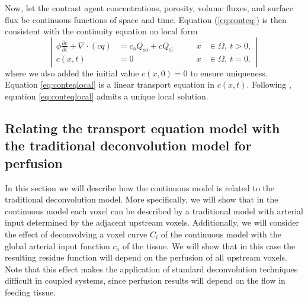 \documentclass[journal,twocolumn]{IEEEtran}
\newcommand{\Qso}{Q_{\mathrm{so}}}
\newcommand{\Qsi}{Q_{\mathrm{si}}}
\newcommand{\ca}{c_\mathrm{a}}
\begin{document}
	Now, let the contrast agent concentrations, porosity, volume fluxes, and surface flux be continuous functions of space and time. 
	Equation (\ref{eq:conteq}) is then consistent with the continuity equation on local form
	\begin{equation}
		\left\vert
		\begin{alignedat}{2}
			\phi \frac{\partial c}{\partial t} + \nabla \cdot (cq) &= \ca\Qso + c\Qsi \qquad	&x &\in \Omega, \ t>0,  \\
			c(x,t) &= 0 																			 	&x &\in \Omega, \ t=0.
		\end{alignedat}
		\right\vert
		\label{eq:conteqlocal}
	\end{equation}
	where we also added the initial value $c(x,0) = 0$ to ensure uniqueness.
	Equation \eqref{eq:conteqlocal} is a linear transport equation in $c(x,t)$. 
	Following \cite{evans98}, equation \eqref{eq:conteqlocal} admits a unique local solution.


\subsection{Relating the transport equation model with the traditional deconvolution model for perfusion}\label{sec:NewAndOld}
	In this section we will describe how the continuous model is related to the traditional deconvolution model.
	More specifically, we will show that in the continuous model each voxel can be described by a traditional model with arterial input determined by the adjacent upstream voxels.
	Additionally, we will consider the effect of deconvolving a voxel curve $C_i$ of the continuous model with the global arterial input function $\ca$ of the tissue.
	We will show that in this case the resulting residue function will depend on the perfusion of all upstream voxels.
	Note that this effect makes the application of standard deconvolution techniques difficult in coupled systems, since perfusion results will depend on the flow in feeding tissue.
	
\end{document}
